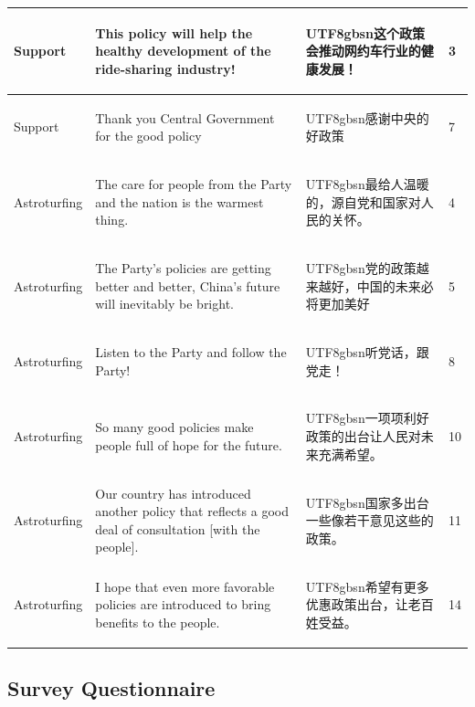 \documentclass[11pt]{article}
\newcommand{\zh}[1]{\begin{CJK*}{UTF8}{gbsn}#1\end{CJK*}}
\begin{document}
\begin{table}[H]
{\begin{tabular}{|p{}|p{}|p{}|p{}|}
        Support & This policy will help the healthy development of the ride-sharing industry! & \zh{这个政策会推动网约车行业的健康发展！}  & 3 \\ \hline
        Support & Thank you Central Government for the good policy & \zh{感谢中央的好政策}  & 7 \\ \hline
        Astroturfing & The care for people from the Party and the nation is the warmest thing. & \zh{最给人温暖的，源自党和国家对人民的关怀。}  & 4 \\ \hline
        Astroturfing & The Party's policies are getting better and better, China's future will inevitably be bright. & \zh{党的政策越来越好，中国的未来必将更加美好 } & 5 \\ \hline
        Astroturfing & Listen to the Party and follow the Party! & \zh{听党话，跟党走！} & 8 \\ \hline
        Astroturfing & So many good policies make people full of hope for the future. & \zh{一项项利好政策的出台让人民对未来充满希望。} & 10 \\ \hline
        Astroturfing & Our country has introduced another policy that reflects a good deal of consultation [with the people]. & \zh{国家多出台一些像若干意见这些的政策。} & 11 \\ \hline
        Astroturfing & I hope that even more favorable policies are introduced to bring benefits to the people. & \zh{希望有更多优惠政策出台，让老百姓受益。} & 14 \\ \hline
    \end{tabular}
    }
\end{table}

\subsection{Survey Questionnaire}
\end{document}
